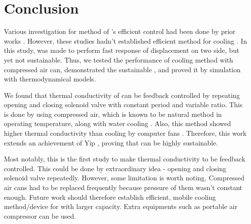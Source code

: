 \section{Conclusion}
Various investigation for method of \scpnospace's efficient control had been done by prior works \cite{haines,mirvakili,yip}. %
However, these studies hadn't established efficient method for cooling \scpnospace. %
In this study, \anta was made to perform fast response of displacement on two side, but yet not sustainable. Thus, we tested the performance of cooling method with compressed air can, demonstrated the sustainable \apcnospace, and proved it by simulation with thermodynamical models. %

We found that thermal conductivity of \scp can be feedback controlled by repeating opening and closing solenoid valve with constant period and variable ratio. %
This is done by using compressed air, which is known to be natural method in operating temperature, along with water cooling \cite{madden}.
Also, this method showed higher thermal conductivity than cooling by computer fans \cite{yip}.
Therefore, this work extends an achievement of Yip \etal, proving that \apc can be highly sustainable.

Most notably, this is the first study to make thermal conductivity to be feedback controlled. This could be done by extraordinary idea - opening and closing solenoid valve repeatedly.
However, some limitation is worth noting. 
Compressed air cans had to be replaced frequently because pressure of them wasn't constant enough. 
Future work should therefore establish efficient, mobile cooling method/device for \scp with larger capacity. 
Extra equipments such as portable air compressor can be used.



